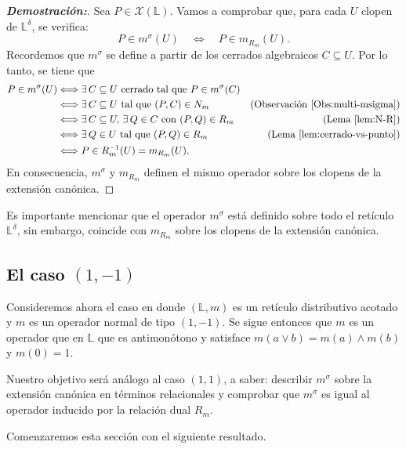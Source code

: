\documentclass[12pt]{book}
\begin{document}
\begin{proof}[\textbf{Demostración:}]
Sea $P\in\mathcal X(\mathbb L)$. Vamos a comprobar que, para cada $U$ clopen de $\mathbb{L}^{\delta}$,
se verifica:
\[
P\in m^\sigma(U)
\quad\Longleftrightarrow\quad
P\in m_{R_m}(U).
\]
Recordemos que $m^\sigma$ se define a partir de
los cerrados algebraicos $C\subseteq U$. Por lo tanto, se tiene que
\begin{align*}
P \in m^\sigma(U)
&\Longleftrightarrow 
\exists\,C\subseteq U \text{ cerrado tal que } P\in m^\sigma(C)\\
&\Longleftrightarrow 
\exists\,C\subseteq U \text{ tal que } (P,C)\in N_m & \text{(Observación \ref{Obs:multi-msigma})}\\
&\Longleftrightarrow 
\exists\,C\subseteq U,\,\exists\,Q\in C \text{ con } (P,Q)\in R_m & \text{(Lema \ref{lem:N-R})}\\
&\Longleftrightarrow 
\exists\,Q\in U \text{ tal que } (P,Q)\in R_m & \text{(Lema \ref{lem:cerrado-vs-punto})} \\
&\Longleftrightarrow 
P\in R_m^{-1}(U)=m_{R_m}(U).
\end{align*}
En consecuencia, $m^\sigma$ y $m_{R_m}$ definen el mismo operador sobre los clopens de la extensión canónica.
\end{proof}

Es importante mencionar que el operador $m^\sigma$ está definido sobre todo el retículo $\mathbb{L}^{\delta}$, sin embargo, coincide con $m_{R_m}$ sobre los clopens de la extensión canónica.

\subsection*{El caso $(1,-1)$}

Consideremos ahora el caso en donde $(\mathbb{L},m)$ es un retículo distributivo acotado y $m$ es un operador normal de tipo $(1,-1)$. Se sigue entonces que $m$ es un operador que en $\mathbb L$ que es antimonótono y satisface  $m(a\vee b)=m(a)\wedge m(b)$ y $m(0)=1$.

\vspace{0.2cm}

Nuestro objetivo será análogo al caso $(1,1)$, a saber: describir $m^\sigma$ sobre la extensión canónica en términos relacionales y comprobar que $m^{\sigma}$ es igual al operador inducido por la relación dual $R_m$.

\vspace{0.2cm}

Comenzaremos esta sección con el siguiente resultado.
\end{document}
